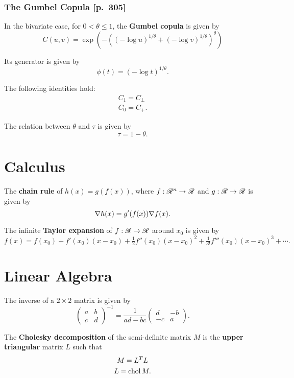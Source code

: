 \subsubsection{The Gumbel Copula [p.~305]}
\begin{outline}
  \1 In the bivariate case, for $0<\theta\leq1$, the \textbf{Gumbel copula} is given by
  \[
    C(u,v) = \exp(-((-\log u)^{1/\theta} + (-\log v)^{1/\theta})^\theta)
  \]

  \1 Its generator is given by
  \[
    \phi(t) = (-\log t)^{1/\theta}.
  \]

  \1 The following identities hold:
  \begin{gather*}
    C_1 = C_\perp\\
    C_0 = C_{+}.
  \end{gather*}

  \1 The relation between $\theta$ and $\tau$ is given by
  \[
    \tau = 1-\theta.
  \]
\end{outline}


\section{Calculus}
\begin{outline}
  \1 The \textbf{chain rule} of $h(x) = g(f(x))$, where $f:\mathscr{R}^n\to\mathscr{R}$ and
  $g:\mathscr{R}\to\mathscr{R}$ is given by
  \[
    \nabla h(x) = g'(f(x))\nabla f(x).  
  \]

  \1 The infinite \textbf{Taylor expansion} of $f:\mathscr{R}\to\mathscr{R}$ around $x_0$ is given by
  \[
    f(x) = f(x_0) + f'(x_0)(x-x_0) + \tfrac{1}{2} f''(x_0)(x-x_0)^2 +
    \tfrac{1}{3!}f'''(x_0)(x-x_0)^3 + \cdots.
  \]
\end{outline}


\section{Linear Algebra}
\begin{outline}
  \1 The inverse of a $2\times2$ matrix is given by
  \[
    \begin{pmatrix}a&b\\c&d\end{pmatrix}^{-1} = \frac{1}{ad-bc}\begin{pmatrix}d&-b\\-c&a\end{pmatrix}.
  \]

  \1 The \textbf{Cholesky decomposition} of the semi-definite matrix $M$ is the
  \textbf{upper triangular} matrix $L$ such that
  \begin{gather*}
    M = L^TL\\
    L = \operatorname{chol} M.
  \end{gather*}
\end{outline}

